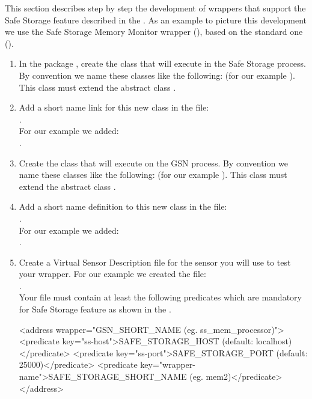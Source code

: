 This section describes step by step the development of wrappers that support the Safe Storage feature described in the .
As an example to picture this development we use the Safe Storage Memory Monitor wrapper (), based on the 
standard one ().

\begin{enumerate}
	\item In the package ,
        create the class that will execute in the Safe Storage process. By convention we name these classes like the following:
         (for our example ). This class must extend the abstract class
        .

	\item Add a short name link for this new class in the file:\\ .\\For our example we added: \\
        .

	\item Create the class that will execute on the GSN process. By convention we name these classes like the following:
	 (for our example ). This class must extend the abstract class
	.

	\item Add a short name definition to this new class in the file:\\ .\\ For our example we added:\\
	.

	\item Create a Virtual Sensor Description file for the sensor you will use to test your wrapper. For our example we created the file:\\
	. \\
	Your \vsd file must contain at least the following predicates which are mandatory for Safe Storage feature as shown in the .
	\begin{xmlcode}
	<address wrapper="GSN_SHORT_NAME (eg. ss_mem_processor)">
		<predicate key="ss-host">SAFE_STORAGE_HOST (default: localhost)</predicate>
		<predicate key="ss-port">SAFE_STORAGE_PORT (default: 25000)</predicate>
		<predicate key="wrapper-name">SAFE_STORAGE_SHORT_NAME (eg. mem2)</predicate>
	</address>
	\end{xmlcode}


\end{enumerate}
